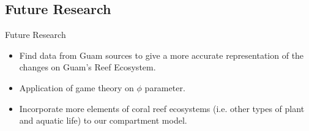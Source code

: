 \documentclass{beamer}
\begin{document}
\subsection{Future Research}
\begin{frame}{Future Research}
    \begin{itemize}
    \item Find data from Guam sources to give a more accurate representation of the changes on Guam's Reef Ecosystem. 
    \item Application of game theory on $\phi$ parameter.
    \item Incorporate more elements of coral reef ecosystems (i.e. other types of plant and aquatic life) to our compartment model.
    \end{itemize}
\end{frame}
\end{document}
